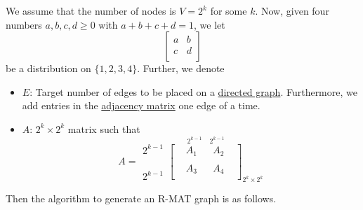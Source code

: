 We assume that the number of nodes is \(V = 2^k\) for some \(k\). Now, given four numbers
\(a, b, c, d \geq 0\) with \(a+b+c+d = 1\), we let
\[
	\begin{bmatrix}
		a & b \\
		c & d \\
	\end{bmatrix}
\]
be a distribution on \(\{1, 2, 3, 4\}\). Further, we denote
\begin{itemize}
	\item \(E\): Target number of edges to be placed on a \hyperref[def:directed-graph]{directed graph}. Furthermore, we add entries in the
	      \hyperref[def:adjacency-matrix]{adjacency matrix} one edge of a time.
	\item \(A\): \(2^k \times 2^k\) matrix such that
	      \[
		      A = \substack{2^{k - 1}\\ \\ \\ \\ 2^{k-1}} \overset{\ 2^{k - 1}\ \ \ \ \ 2^{k-1}}{\begin{bmatrix}
				       & A_1 &  & A_2 & \\
				       &     &  &     & \\
				       & A_3 &  & A_4 & \\
			      \end{bmatrix}}_{2^k\times 2^k}
	      \]
\end{itemize}

Then the algorithm to generate an R-MAT graph is as follows.

